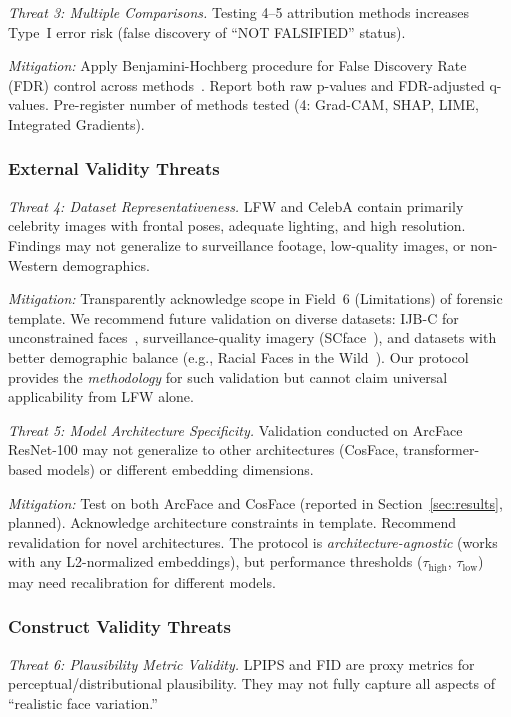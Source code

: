 \textit{Threat 3: Multiple Comparisons.} Testing 4--5 attribution methods increases Type~I error risk (false discovery of ``NOT FALSIFIED'' status).

\textit{Mitigation:} Apply Benjamini-Hochberg procedure for False Discovery Rate (FDR) control across methods~\cite{benjamini1995controlling}. Report both raw p-values and FDR-adjusted q-values. Pre-register number of methods tested (4: Grad-CAM, SHAP, LIME, Integrated Gradients).

\subsubsection{External Validity Threats}

\textit{Threat 4: Dataset Representativeness.} LFW and CelebA contain primarily celebrity images with frontal poses, adequate lighting, and high resolution. Findings may not generalize to surveillance footage, low-quality images, or non-Western demographics.

\textit{Mitigation:} Transparently acknowledge scope in Field~6 (Limitations) of forensic template. We recommend future validation on diverse datasets: IJB-C for unconstrained faces~\cite{maze2018iarpa}, surveillance-quality imagery (SCface~\cite{grgic2011scface}), and datasets with better demographic balance (e.g., Racial Faces in the Wild~\cite{wang2019racial}). Our protocol provides the \textit{methodology} for such validation but cannot claim universal applicability from LFW alone.

\textit{Threat 5: Model Architecture Specificity.} Validation conducted on ArcFace ResNet-100 may not generalize to other architectures (CosFace, transformer-based models) or different embedding dimensions.

\textit{Mitigation:} Test on both ArcFace and CosFace (reported in Section~\ref{sec:results}, planned). Acknowledge architecture constraints in template. Recommend revalidation for novel architectures. The protocol is \textit{architecture-agnostic} (works with any L2-normalized embeddings), but performance thresholds ($\tau_{\text{high}}$, $\tau_{\text{low}}$) may need recalibration for different models.

\subsubsection{Construct Validity Threats}

\textit{Threat 6: Plausibility Metric Validity.} LPIPS and FID are proxy metrics for perceptual/distributional plausibility. They may not fully capture all aspects of ``realistic face variation.''

